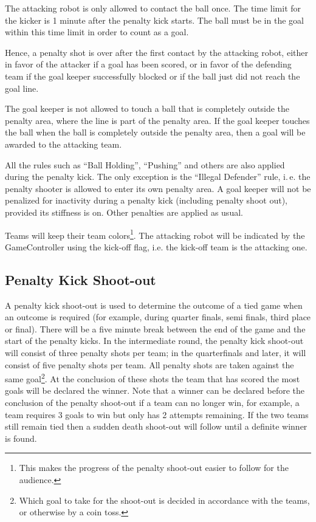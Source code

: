 \documentclass[12pt]{article}
\newcommand{\ie}{\mbox{i.\,e.}\xspace}
\begin{document}
The attacking robot is only allowed to contact the ball once.  The time limit for the kicker is 1 minute after the penalty kick starts. The ball must be in the goal within this time limit in order to count as a goal.

Hence, a penalty shot is over after the first contact by the attacking robot, either in favor of the attacker if a goal has been scored, or in favor of the defending team if the goal keeper successfully blocked or if the ball just did not reach the goal line.

The goal keeper is not allowed to touch a ball that is completely outside the penalty area, where the line is part of the penalty area. If the goal keeper touches the ball when the ball is completely outside the penalty area, then a goal will be awarded to the attacking team.

All the rules such as ``Ball Holding'', ``Pushing'' and others are also applied during the penalty kick. The only exception is the ``Illegal Defender'' rule, \ie the penalty shooter is allowed to enter its own penalty area.
A goal keeper will not be penalized for inactivity during a penalty kick (including penalty shoot out), provided its stiffness is on. Other penalties are applied as usual.

Teams will keep their team colors\footnote{This makes the progress of the penalty shoot-out easier to follow for the audience.}.
The attacking robot will be indicated by the GameController using the kick-off flag, i.e. the kick-off team is the attacking one.


\subsection{Penalty Kick Shoot-out}
\label{sec:penalty_shoot-out}

A penalty kick shoot-out is used to determine the outcome of a tied game when an outcome is required (for example, during quarter finals, semi finals, third place or final). 
There will be a five minute break between the end of the game and the start of the penalty kicks.
In the intermediate round, the penalty kick shoot-out will consist of three penalty shots per team; in the quarterfinals and later, it will consist of five penalty shots per team.
All penalty shots are taken against the same goal\footnote{Which goal to take for the shoot-out is decided in accordance with the teams, or otherwise by a coin toss.}. At the conclusion of these shots the team that has scored the most goals will be declared the winner. Note that a winner can be declared before the conclusion of the penalty shoot-out if a team can no longer win, for example, a team requires 3 goals to win but only has 2 attempts remaining. If the two teams still remain tied then a sudden death shoot-out will follow until a definite winner is found.
\end{document}
